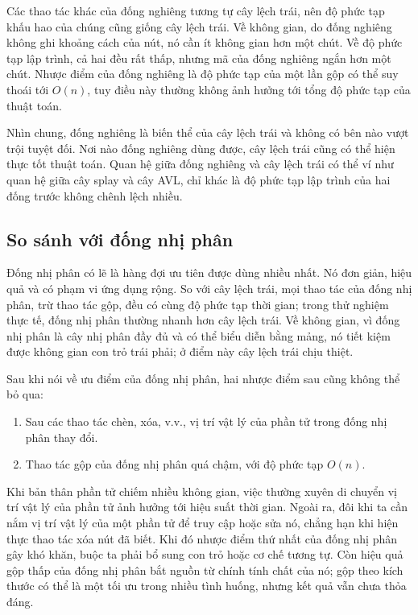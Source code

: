 \documentclass[11pt]{article}
\begin{document}
Các thao tác khác của đống nghiêng tương tự cây lệch trái, nên độ phức tạp khấu
hao của chúng cũng giống cây lệch trái. Về không gian, do đống nghiêng không ghi
khoảng cách của nút, nó cần ít không gian hơn một chút. Về độ phức tạp lập
trình, cả hai đều rất thấp, nhưng mã của đống nghiêng ngắn hơn một chút. Nhược
điểm của đống nghiêng là độ phức tạp của một lần gộp có thể suy thoái tới
\(O(n)\), tuy điều này thường không ảnh hưởng tới tổng độ phức tạp của thuật
toán.

Nhìn chung, đống nghiêng là biến thể của cây lệch trái và không có bên nào vượt
trội tuyệt đối. Nơi nào đống nghiêng dùng được, cây lệch trái cũng có thể hiện
thực tốt thuật toán. Quan hệ giữa đống nghiêng và cây lệch trái có thể ví như
quan hệ giữa cây splay và cây AVL, chỉ khác là độ phức tạp lập trình của hai
đống trước không chênh lệch nhiều.

\subsection{So sánh với đống nhị phân}

Đống nhị phân có lẽ là hàng đợi ưu tiên được dùng nhiều nhất. Nó đơn giản, hiệu
quả và có phạm vi ứng dụng rộng. So với cây lệch trái, mọi thao tác của đống
nhị phân, trừ thao tác gộp, đều có cùng độ phức tạp thời gian; trong thử nghiệm
thực tế, đống nhị phân thường nhanh hơn cây lệch trái. Về không gian, vì đống
nhị phân là cây nhị phân đầy đủ và có thể biểu diễn bằng mảng, nó tiết kiệm
được không gian con trỏ trái phải; ở điểm này cây lệch trái chịu thiệt.

Sau khi nói về ưu điểm của đống nhị phân, hai nhược điểm sau cũng không thể bỏ
qua:
\begin{enumerate}
  \item Sau các thao tác chèn, xóa, v.v., vị trí vật lý của phần tử trong đống
  nhị phân thay đổi.
  \item Thao tác gộp của đống nhị phân quá chậm, với độ phức tạp \(O(n)\).
\end{enumerate}

Khi bản thân phần tử chiếm nhiều không gian, việc thường xuyên di chuyển vị trí
vật lý của phần tử ảnh hưởng tới hiệu suất thời gian. Ngoài ra, đôi khi ta cần
nắm vị trí vật lý của một phần tử để truy cập hoặc sửa nó, chẳng hạn khi hiện
thực thao tác xóa nút đã biết. Khi đó nhược điểm thứ nhất của đống nhị phân gây
khó khăn, buộc ta phải bổ sung con trỏ hoặc cơ chế tương tự. Còn hiệu quả gộp
thấp của đống nhị phân bắt nguồn từ chính tính chất của nó; gộp theo kích thước
có thể là một tối ưu trong nhiều tình huống, nhưng kết quả vẫn chưa thỏa đáng.
\end{document}

